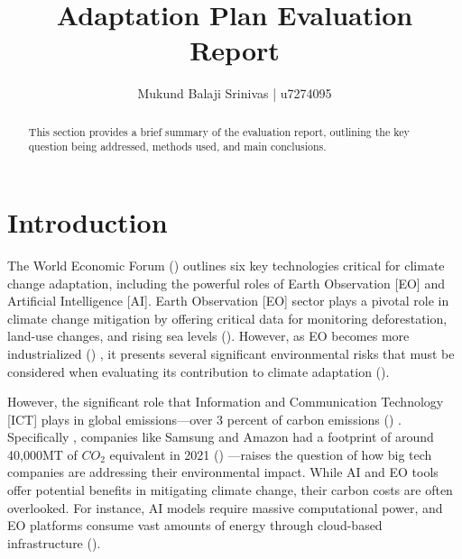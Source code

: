 \documentclass[12pt]{article}
\title{Adaptation Plan Evaluation Report}
\author{Mukund Balaji Srinivas | u7274095}
\date{} %
\begin{document}
\maketitle

\begin{abstract}
This section provides a brief summary of the evaluation report, outlining the key question being addressed, methods used, and main conclusions.
\end{abstract}

\newpage

\section*{Introduction}

The World Economic Forum (\cite{masterson_2024})  outlines six key technologies critical for climate change adaptation, 
including the powerful roles of Earth Observation [EO] and Artificial Intelligence [AI]. Earth Observation 
[EO] sector plays a pivotal role in climate change mitigation by offering critical data for monitoring deforestation, land-use changes, and rising sea levels (\cite{anderson_2017}). 
However, as EO becomes more industrialized (\cite{venkatesan_2020}) , it presents several significant environmental risks that must be considered when evaluating its contribution to climate adaptation (\cite{crisp_2020}).


However, the significant role that Information and Communication Technology [ICT] 
plays in global emissions—over 3 percent of carbon emissions (\cite{jones_2018}) . Specifically , 
companies like Samsung and Amazon had a footprint of around 40,000MT of \(CO_2\) equivalent in 2021 (\cite{navarro_2023_the}) —raises the question 
of how big tech companies are addressing their environmental impact. While AI and EO tools offer potential benefits in 
mitigating climate change, their carbon costs are often overlooked. For instance, AI models require massive computational power, 
and EO platforms consume vast amounts of energy through cloud-based infrastructure (\cite{taddeo_2021}).
\end{document}
